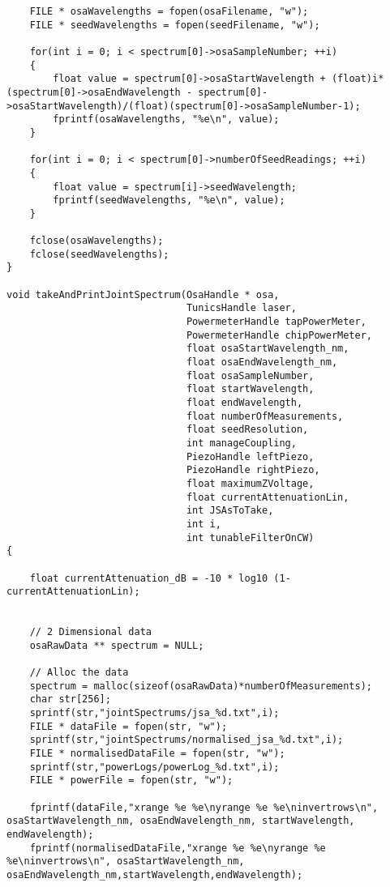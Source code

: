 \begin{lstlisting}
    FILE * osaWavelengths = fopen(osaFilename, "w");
    FILE * seedWavelengths = fopen(seedFilename, "w");

    for(int i = 0; i < spectrum[0]->osaSampleNumber; ++i)
    {
        float value = spectrum[0]->osaStartWavelength + (float)i*(spectrum[0]->osaEndWavelength - spectrum[0]->osaStartWavelength)/(float)(spectrum[0]->osaSampleNumber-1);
        fprintf(osaWavelengths, "%e\n", value);
    }

    for(int i = 0; i < spectrum[0]->numberOfSeedReadings; ++i)
    {
        float value = spectrum[i]->seedWavelength;
        fprintf(seedWavelengths, "%e\n", value);
    }

    fclose(osaWavelengths);
    fclose(seedWavelengths);
}

void takeAndPrintJointSpectrum(OsaHandle * osa,
                               TunicsHandle laser,
                               PowermeterHandle tapPowerMeter,
                               PowermeterHandle chipPowerMeter,
                               float osaStartWavelength_nm,
                               float osaEndWavelength_nm,
                               float osaSampleNumber,
                               float startWavelength,
                               float endWavelength,
                               float numberOfMeasurements,
                               float seedResolution,
                               int manageCoupling,
                               PiezoHandle leftPiezo,
                               PiezoHandle rightPiezo,
                               float maximumZVoltage,
                               float currentAttenuationLin,
                               int JSAsToTake,
                               int i,
                               int tunableFilterOnCW)
{

    float currentAttenuation_dB = -10 * log10 (1-currentAttenuationLin);


    // 2 Dimensional data
    osaRawData ** spectrum = NULL;

    // Alloc the data
    spectrum = malloc(sizeof(osaRawData)*numberOfMeasurements);
    char str[256];
    sprintf(str,"jointSpectrums/jsa_%d.txt",i);
    FILE * dataFile = fopen(str, "w");
    sprintf(str,"jointSpectrums/normalised_jsa_%d.txt",i);
    FILE * normalisedDataFile = fopen(str, "w");
    sprintf(str,"powerLogs/powerLog_%d.txt",i);
    FILE * powerFile = fopen(str, "w");

    fprintf(dataFile,"xrange %e %e\nyrange %e %e\ninvertrows\n", osaStartWavelength_nm, osaEndWavelength_nm, startWavelength, endWavelength);
    fprintf(normalisedDataFile,"xrange %e %e\nyrange %e %e\ninvertrows\n", osaStartWavelength_nm, osaEndWavelength_nm,startWavelength,endWavelength);


\end{lstlisting}
